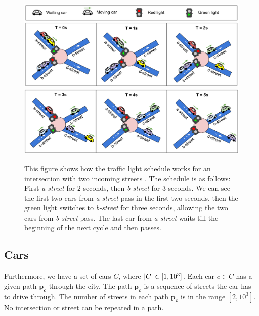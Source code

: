 \begin{figure}[ht] %
    \centering
    \includegraphics[width=\linewidth]{img/hashcode/figure2-abc.png}
    \includegraphics[width=\linewidth]{img/hashcode/figure2-def.png}
    \caption[Example of a traffic light schedule]{
        This figure shows how the traffic light schedule works for an intersection with two incoming streets \cite{google2023google}.
        The schedule is as follows: First \textit{a-street} for $2$ seconds, then \textit{b-street} for $3$ seconds.
        We can see the first two cars from \textit{a-street} pass in the first two seconds, then the green light switches to \textit{b-street} for three seconds,
        allowing the two cars from \textit{b-street} pass. The last car from \textit{a-street} waits till the beginning of the next cycle and then passes.
    }
    \label{fig:hashcode_traffic_lights}
\end{figure}

\subsection{Cars}

Furthermore, we have a set of cars $C$, where $\left|{C}\right| \in [1, 10^3]$. Each car $c \in C$ has a given path $\bm{p_c}$ through the city. The path $\bm{p_c}$ is a sequence of streets the car has to drive through.
The number of streets in each path $\bm{p_c}$ is in the range $[2, 10^3]$.
No intersection or street can be repeated in a path.

